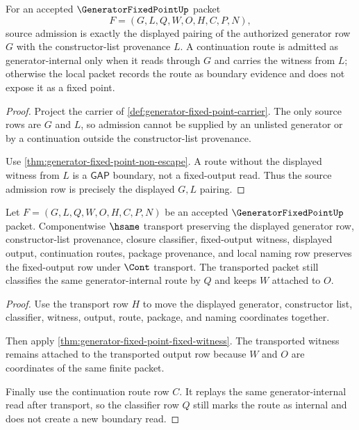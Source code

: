 \begin{theorem}
\label{thm:generator-fixed-point-source-admission-row}
For an accepted $\GeneratorFixedPointUp$ packet
$$
F=(G,L,Q,W,O,H,C,P,N),
$$
source admission is exactly the displayed pairing of the authorized generator row $G$ with the constructor-list provenance $L$. A continuation route is admitted as generator-internal only when it reads through $G$ and carries the witness from $L$; otherwise the local packet records the route as boundary evidence and does not expose it as a fixed point.
\end{theorem}
\begin{proof}
Project the carrier of \autoref{def:generator-fixed-point-carrier}. The only source rows are $G$ and $L$, so admission cannot be supplied by an unlisted generator or by a continuation outside the constructor-list provenance.

Use \autoref{thm:generator-fixed-point-non-escape}. A route without the displayed witness from $L$ is a $\mathsf{GAP}$ boundary, not a fixed-output read. Thus the source admission row is precisely the displayed $G,L$ pairing.
\end{proof}

\begin{theorem}
\label{thm:generator-fixed-point-transport-row}
Let $F=(G,L,Q,W,O,H,C,P,N)$ be an accepted $\GeneratorFixedPointUp$ packet. Componentwise $\hsame$ transport preserving the displayed generator row, constructor-list provenance, closure classifier, fixed-output witness, displayed output, continuation routes, package provenance, and local naming row preserves the fixed-output row under $\Cont$ transport. The transported packet still classifies the same generator-internal route by $Q$ and keeps $W$ attached to $O$.
\end{theorem}
\begin{proof}
Use the transport row $H$ to move the displayed generator, constructor list, classifier, witness, output, route, package, and naming coordinates together.

Then apply \autoref{thm:generator-fixed-point-fixed-witness}. The transported witness remains attached to the transported output row because $W$ and $O$ are coordinates of the same finite packet.

Finally use the continuation route row $C$. It replays the same generator-internal read after transport, so the classifier row $Q$ still marks the route as internal and does not create a new boundary read.
\end{proof}


